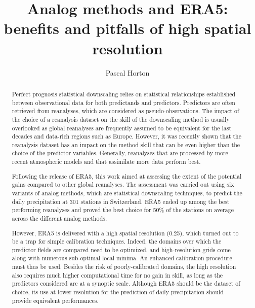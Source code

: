\documentclass[alpha-refs]{wiley-article}
\title{Analog methods and ERA5: benefits and pitfalls of high spatial resolution}
\author[1]{Pascal Horton}
\affil[1]{Oeschger Centre for Climate Change Research and Institute of Geography, University of Bern, Bern, Switzerland}
\begin{document}
\maketitle

\begin{abstract}
Perfect prognosis statistical downscaling relies on statistical relationships established between observational data for both predictands and predictors. Predictors are often retrieved from reanalyses, which are considered as pseudo-observations. The impact of the choice of a reanalysis dataset on the skill of the downscaling method is usually overlooked as global reanalyses are frequently assumed to be equivalent for the last decades and data-rich regions such as Europe. However, it was recently shown that the reanalysis dataset has an impact on the method skill that can be even higher than the choice of the predictor variables. Generally, reanalyses that are processed by more recent atmospheric models and that assimilate more data perform best.

Following the release of ERA5, this work aimed at assessing the extent of the potential gains compared to other global reanalyses. The assessment was carried out using six variants of analog methods, which are statistical downscaling techniques, to predict the daily precipitation at 301 stations in Switzerland. ERA5 ended up among the best performing reanalyses and proved the best choice for 50\% of the stations on average across the different analog methods.

However, ERA5 is delivered with a high spatial resolution (0.25\degree), which turned out to be a trap for simple calibration techniques. Indeed, the domains over which the predictor fields are compared need to be optimized, and high-resolution grids come along with numerous sub-optimal local minima. An enhanced calibration procedure must thus be used. Besides the risk of poorly-calibrated domains, the high resolution also requires much higher computational time for no gain in skill, as long as the predictors considered are at a synoptic scale. Although ERA5 should be the dataset of choice, its use at lower resolution for the prediction of daily precipitation should provide equivalent performances.



\end{abstract}
\end{document}
